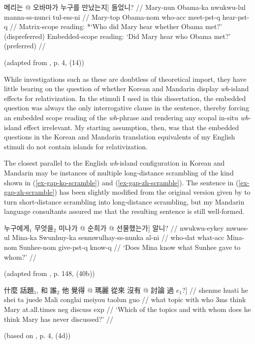 \ex 
\begingl[everygla = \ko]
\gla 메리는 \nogloss{[} @ 오바마가 누구를 만났는지] 들었니? //\label{ex-gap-ko-kg}
\glb Mary-nun Obama-ka nwukwu-lul manna-ss-nunci tul-ess-ni  //
\glc Mary-{\sc top} Obama-{\sc nom} who-{\sc acc} meet-{\sc pst-q} hear-{\sc pst-q} //
\glft Matrix-scope reading: *`Who did Mary hear whether Obama met?' (dispreferred) \newline
Embedded-scope reading: `Did Mary hear who Obama met?' (preferred) //
\endgl
\par\nobreak\vspace{5pt}
\hfill (adapted from \cite{kim.goodall2016}, p. 4, (14))
\xe 

While investigations such as these are doubtless of theoretical import, they have little bearing on the question of whether Korean and Mandarin display \textit{wh}-island effects for relativization. In the stimuli I used in this dissertation, the embedded question was always the only interrogative clause in the sentence, thereby forcing an embedded scope reading of the \textit{wh}-phrase and rendering any scopal in-situ \textit{wh}-island effect irrelevant. My starting assumption, then, was that the embedded questions in the Korean and Mandarin translation equivalents of my English stimuli do not contain islands for relativization.

The closest parallel to the English \textit{wh}-island configuration in Korean and Mandarin may be instances of multiple long-distance scrambling of the kind shown in (\ref{ex-gap-ko-scramble}) and (\ref{ex-gap-zh-scramble}). The sentence in (\ref{ex-gap-zh-scramble}) has been slightly modified from the original version given by \textcite{ren2023} to turn short-distance scrambling into long-distance scrambling, but my Mandarin language consultants assured me that the resulting sentence is still well-formed.

\ex 
\begingl[everygla = \ko]\label{ex-gap-ko-scramble}
\gla 누구에게$_1$ 무엇을$_2$ 미나가 \nogloss{[} @ 순희가  @ 선물했는가] 알니? //
\glb nwukwu-eykey mwues-ul Mina-ka Swunhuy-ka senmwulhay-ss-nunka al-ni //
\glc who-{\sc dat} what-{\sc acc} Mina-{\sc nom} Sunhee-{\sc nom} give-{\sc pst-q} know-{\sc q} //
\glft `Does Mina know what Sunhee gave to whom?' //
\endgl
\par\nobreak\vspace{5pt}
\hfill (adapted from \cite{kang2005}, p. 148, (40b))
\xe 

\ex 
\begingl[everygla = \zh]\label{ex-gap-zh-scramble}
\gla 什麼 話題$_1$, 和 誰$_2$ 他 覺得 \nogloss{[} @ 瑪麗 從來 沒有  @ 討論 過 $e_1$?] //
\glb shenme huati he shei ta juede Mali conglai meiyou taolun guo //
\glc what topic with who {\sc 3ms} think Mary at.all.times {\sc neg} discuss {\sc exp} //
\glft `Which of the topics and with whom does he think Mary has never discussed?' //
\endgl
\par\nobreak\vspace{5pt}
\hfill (based on \cite{ren2023}, p. 4, (4d))
\xe 

